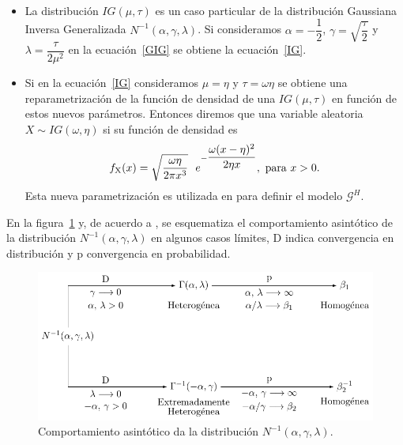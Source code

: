 \begin{remark} \ 
	\begin{itemize}
		\item La distribución $IG(\mu,\tau)$ es un caso particular de la distribución Gaussiana Inversa Generalizada $N^{-1}(\alpha,\gamma,\lambda)$. Si consideramos $\alpha=-\dfrac{1}{2}$, $\gamma=\sqrt{\dfrac{\tau}{2}}$ y $\lambda=\dfrac{\tau}{2\mu^2}$ en la ecuación~\eqref{GIG} se obtiene la ecuación~\eqref{IG}.
		\item Si en la ecuación~\eqref{IG} consideramos $\mu=\eta$ y $\tau=\omega \eta$ se obtiene una reparametrización de la función de densidad de una $IG(\mu,\tau)$ en función de estos nuevos parámetros. Entonces diremos que una variable aleatoria $X \sim IG(\omega,\eta)$ si su función de densidad es 
		\begin{align}
		\label{OtraIG}
		f_{\text X}(x)=\sqrt{\dfrac{\omega \eta}{2 \pi x^3}} \ \ e^{- \dfrac{\omega (x-\eta)^2}{2 \eta x}}, \text{ para } x>0.
		\end{align}
		Esta nueva parametrización es utilizada en \citet{Buemi2009} para definir el modelo $\mathcal{G}^H$.
	\end{itemize} 
\end{remark}


En la figura~\ref{RelacionInversaGaussiana} y, de acuerdo a \citet{Frery99}, se esquematiza el comportamiento asintótico de la distribución $N^{-1}(\alpha,\gamma,\lambda)$ en algunos casos límites, D indica convergencia en distribución y p convergencia en probabilidad.

\begin{figure}[hbt]
	\centering    
	\includegraphics[scale=1]{../../Figures/Tesis/Capitulo4/RelacionInversaGaussiana.pdf}
	\caption{\label{RelacionInversaGaussiana}Comportamiento asintótico da la distribución $N^{-1}(\alpha,\gamma,\lambda)$.} %
\end{figure} 

